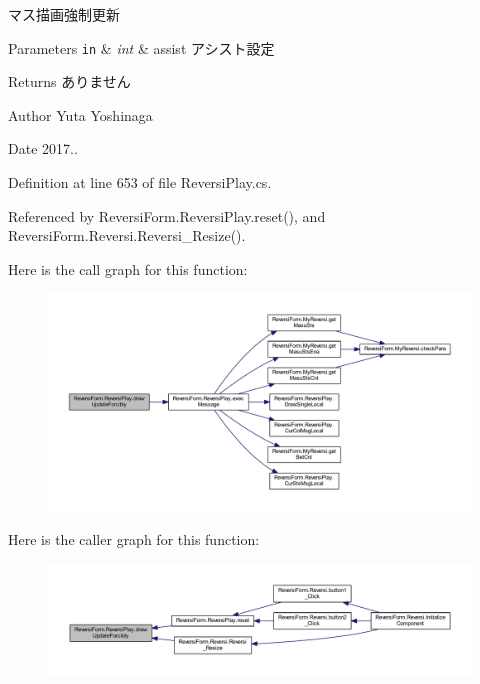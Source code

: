 マス描画強制更新 


\begin{DoxyParams}[1]{Parameters}
\mbox{\tt in}  & {\em int} & assist アシスト設定 \\
\hline
\end{DoxyParams}
\begin{DoxyReturn}{Returns}
ありません 
\end{DoxyReturn}
\begin{DoxyAuthor}{Author}
Yuta Yoshinaga 
\end{DoxyAuthor}
\begin{DoxyDate}{Date}
2017.. 
\end{DoxyDate}


Definition at line 653 of file Reversi\+Play.\+cs.



Referenced by Reversi\+Form.\+Reversi\+Play.\+reset(), and Reversi\+Form.\+Reversi.\+Reversi\+\_\+\+Resize().

Here is the call graph for this function\+:
\nopagebreak
\begin{figure}[H]
\begin{center}
\leavevmode
\includegraphics[width=350pt]{class_reversi_form_1_1_reversi_play_accc1d553ba6a6c2a5f0c58316b40a183_cgraph}
\end{center}
\end{figure}
Here is the caller graph for this function\+:
\nopagebreak
\begin{figure}[H]
\begin{center}
\leavevmode
\includegraphics[width=350pt]{class_reversi_form_1_1_reversi_play_accc1d553ba6a6c2a5f0c58316b40a183_icgraph}
\end{center}
\end{figure}
\mbox{\label{class_reversi_form_1_1_reversi_play_aa7cf1089065bff85997d057210312ae8}} 
